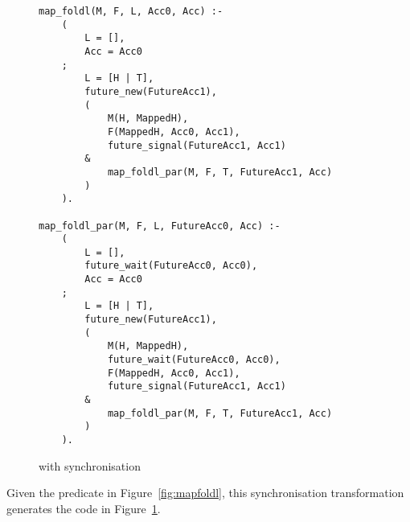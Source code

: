 \begin{figure}
\begin{verbatim}
map_foldl(M, F, L, Acc0, Acc) :-
    (
        L = [],
        Acc = Acc0
    ;
        L = [H | T],
        future_new(FutureAcc1),
        (
            M(H, MappedH),
            F(MappedH, Acc0, Acc1),
            future_signal(FutureAcc1, Acc1)
        &
            map_foldl_par(M, F, T, FutureAcc1, Acc)
        )
    ).

map_foldl_par(M, F, L, FutureAcc0, Acc) :-
    (
        L = [],
        future_wait(FutureAcc0, Acc0),
        Acc = Acc0
    ;
        L = [H | T],
        future_new(FutureAcc1),
        (
            M(H, MappedH),
            future_wait(FutureAcc0, Acc0),
            F(MappedH, Acc0, Acc1),
            future_signal(FutureAcc1, Acc1)
        &
            map_foldl_par(M, F, T, FutureAcc1, Acc)
        )
    ).
\end{verbatim}
\caption{\mapfoldl{} with synchronisation}
\label{fig:map_foldl_sync}
\end{figure}

Given the \mapfoldl predicate in Figure~\ref{fig:mapfoldl},
this synchronisation transformation
generates the code in Figure~\ref{fig:map_foldl_sync}.


